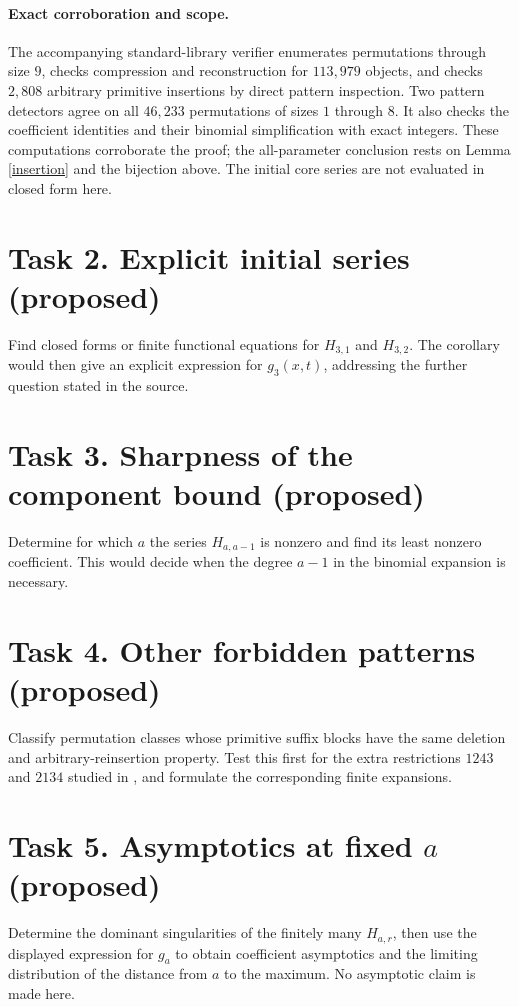 \documentclass[11pt]{article}
\begin{document}
\paragraph{Exact corroboration and scope.}
The accompanying standard-library verifier enumerates permutations
through size $9$, checks compression and reconstruction for
$113{,}979$ objects, and checks $2{,}808$ arbitrary primitive
insertions by direct pattern inspection. Two pattern detectors
agree on all $46{,}233$ permutations of sizes $1$ through $8$.
It also checks the coefficient identities and their binomial
simplification with exact integers. These computations corroborate
the proof; the all-parameter conclusion rests on
Lemma \ref{insertion} and the bijection above. The initial core
series are not evaluated in closed form here.

\section*{Task 2. Explicit initial series (proposed)}
Find closed forms or finite functional equations for $H_{3,1}$
and $H_{3,2}$. The corollary would then give an explicit expression
for $g_3(x,t)$, addressing the further question stated in the source.

\section*{Task 3. Sharpness of the component bound (proposed)}
Determine for which $a$ the series $H_{a,a-1}$ is nonzero and
find its least nonzero coefficient. This would decide when the
degree $a-1$ in the binomial expansion is necessary.

\section*{Task 4. Other forbidden patterns (proposed)}
Classify permutation classes whose primitive suffix blocks have
the same deletion and arbitrary-reinsertion property. Test this
first for the extra restrictions $1243$ and $2134$ studied in
\cite{GLW26}, and formulate the corresponding finite expansions.

\section*{Task 5. Asymptotics at fixed $a$ (proposed)}
Determine the dominant singularities of the finitely many
$H_{a,r}$, then use the displayed expression for $g_a$ to obtain
coefficient asymptotics and the limiting distribution of the
distance from $a$ to the maximum. No asymptotic claim is made here.
\end{document}

